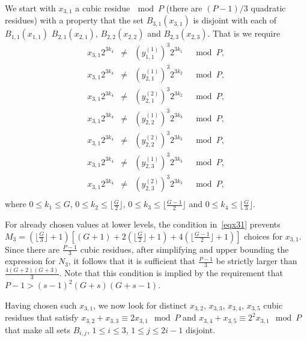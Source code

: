 We start with $x_{3,1}$ a cubic residue$~\mod P$ (there are
$(P-1)/3$ quadratic residues) with a property that the set
$B_{3,1}(x_{3,1})$ is disjoint with each of $B_{1,1}(x_{1,1})$
$B_{2,1}(x_{2,1})$, $B_{2,2}(x_{2,2})$ and $B_{2,3}(x_{2,3})$.
That is we require
\begin{equation}\label{eqx31}\begin{array}{cccc}
x_{3,1}2^{3k_4} &\neq& (y_{1,1}^{(1)})^3 2^{3k_1} &\mod P, \\
x_{3,1}2^{3k_4} &\neq& (y_{2,1}^{(1)})^3 2^{3k_2} &\mod P, \\
x_{3,1}2^{3k_4} &\neq& (y_{2,1}^{(2)})^3 2^{3k_2} &\mod P, \\
x_{3,1}2^{3k_4} &\neq& (y_{2,2}^{(1)})^3 2^{3k_3} &\mod P, \\
x_{3,1}2^{3k_4} &\neq& (y_{2,2}^{(2)})^3 2^{3k_3} &\mod P, \\
x_{3,1}2^{3k_4} &\neq& (y_{2,3}^{(1)})^3 2^{3k_3} &\mod P, \\
x_{3,1}2^{3k_4} &\neq& (y_{2,3}^{(2)})^3 2^{3k_3} &\mod P, \\
\end{array}\end{equation}
where $0 \leq k_1 \leq G$, $0 \leq k_2 \leq \lfloor \frac{G}{2}
\rfloor$, $0 \leq k_3 \leq \lfloor\frac{G-1}{2} \rfloor$ and $0
\leq k_4 \leq \lfloor\frac{G}{3} \rfloor$.

For already chosen values at lower levels, the condition
in~\eqref{eqx31} prevents $M_3= \left(\lfloor \frac{G}{3} \rfloor
+1 \right)\left[ (G+1)+2\left(\lfloor \frac{G}{2} \rfloor +1
\right) +4\left(\lfloor \frac{G-1}{2} \rfloor +1 \right)\right]$
choices for $x_{3,1}$. Since there are $\frac{P-1}{3}$ cubic
residues, after simplifying and upper bounding the expression for
$N_3$, it follows that it is sufficient that $\frac{P-1}{3}$ be
strictly larger than $\frac{4(G+2)(G+3)}{3}$. Note that this
condition is implied by the requirement that $P-1>
(s-1)^2(G+s)(G+s-1)$.

Having chosen such $x_{3,1}$, we now look for distinct $x_{3,2}$,
$x_{3,3}$, $x_{3,4}$, $x_{3,5}$ cubic  residues that satisfy
$x_{3,2}+x_{3,3} \equiv 2x_{3,1} \mod P$ and $x_{3,4}+x_{3,5}
\equiv 2^2x_{3,1} \mod P$ that make all sets $B_{i,j}$, $1 \leq i
\leq 3$, $1 \leq j \leq 2i-1$ disjoint.

